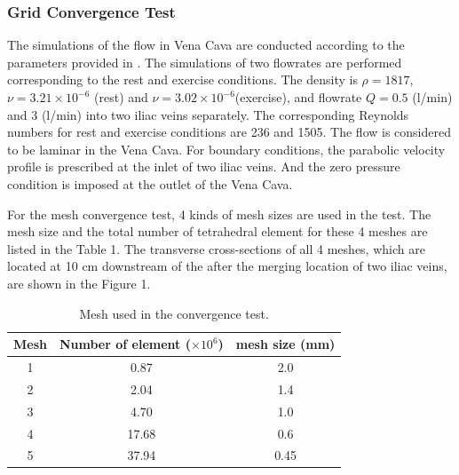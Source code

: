 \subsubsection*{Grid Convergence Test}

The simulations of the flow in Vena Cava are conducted according to the parameters provided in \cite{craven_cfd}. The simulations of two flowrates are performed corresponding to the rest and exercise conditions. The density is $\rho=1817$, $\nu=3.21\times10^{-6}$ (rest) and $\nu=3.02\times10^{-6}$(exercise), and flowrate $Q= 0.5$ (l/min) and $3$ (l/min) into two iliac veins separately. The corresponding Reynolds numbers for rest and exercise conditions are 236 and 1505. The flow is considered to be laminar in the Vena Cava.
For boundary conditions, the parabolic velocity profile is prescribed at the inlet of two iliac veins. And the zero pressure condition is imposed at the outlet of the Vena Cava. 

For the mesh convergence test, 4 kinds of mesh sizes are used in the test. The mesh size and the total number of tetrahedral element for these 4 meshes are listed in the Table 1. The transverse cross-sections of all 4 meshes, which are located at 10 cm downstream of the after the merging location of two iliac veins, are shown in the Figure 1.

\begin{table}[h]
\caption {Mesh used in the convergence test.} \label{tab:meshsize}
\centering
\begin{tabular}{|c|c|c|}
\hline
Mesh & Number of element ($\times10^6$)& mesh size (mm) \\ \hline
1    & 0.87              & 2.0              \\ \hline
2    & 2.04              & 1.4            \\ \hline
3    & 4.70              & 1.0               \\ \hline
4    & 17.68             & 0.6            \\ \hline
5    & 37.94             & 0.45            \\ \hline
\end{tabular}
\end{table}


